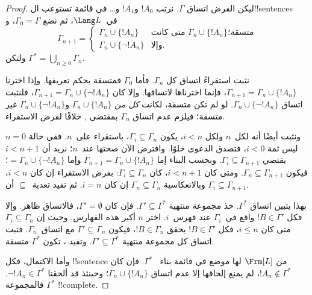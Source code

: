 \documentclass[../../../include/open-logic-section]{subfiles}
\begin{document}
\begin{proof}
ليكن الفرض اتساق $\Gamma$. نرتب $!A_0$ و$!A_1$ و\dots{} في قائمة
تستوعب ال!!{sentence}s في~$\Lang L$، ثم نضع $\Gamma_0 = \Gamma$، و
\[
\Gamma_{n+1} =
\begin{cases}
\Gamma_n \cup \{ !A_n \} & \textrm{متى كانت $\Gamma_n \cup \{!A_n\}$
  متسقة؛} \\
\Gamma_n \cup \{ \lnot !A_n \} & \textrm{وإلا.}
\end{cases}
\]
ولتكن $\Gamma^* = \bigcup_{n \geq 0} \Gamma_n$.

نثبت استقراءً اتساق كل $\Gamma_n$. فأما $\Gamma_0$ فمتسقة بحكم
تعريفها. وإذا اخترنا $\Gamma_{n+1} = \Gamma_n \cup \{!A_n\}$، فإنما
اخترناها لاتساقها. وإلا كان $\Gamma_{n+1} = \Gamma_n \cup \{\lnot !A_n\}$،
فلنثبت اتساق $\Gamma_n \cup \{\lnot !A_n\}$. لو لم تكن متسقة، لكانت
\emph{كل من} $\Gamma_n \cup \{!A_n\}$ و$\Gamma_n \cup \{\lnot !A_n\}$
غير متسقة؛ فيلزم عدم اتساق $\Gamma_n$ بمقتضى
,
خلافًا لفرض الاستقراء.

ونثبت أيضًا أنه لكل~$n$ ولكل $i < n$، يكون $\Gamma_i \subseteq \Gamma_n$،
باستقراء على~$n$. ففي حالة $n=0$ ليس ثمة $i < 0$، فتصدق الدعوى
خلوًا. وافترض الآن صحتها عند~$n$؛ نريد أن $i < n+1$ يقتضي
$\Gamma_i \subseteq \Gamma_{n+1}$. وبحسب البناء إما
$\Gamma_{n+1} = \Gamma_n \cup \{!A_n\}$ وإما $= \Gamma_n \cup \{\lnot
!A_n\}$؛ فيكون $\Gamma_n \subseteq \Gamma_{n+1}$. ومتى كان $i < n+1$،
كان $\Gamma_i \subseteq \Gamma_n$: بفرض الاستقراء إن كان $i < n$،
وبالانعكاسية $\Gamma_n \subseteq \Gamma_n$ إن كان $i = n$. ثم تفيد
تعدية~$\subseteq$ أن $\Gamma_i \subseteq \Gamma_{n+1}$.

بهذا يتبين اتساق $\Gamma^*$. خذ مجموعة منتهية
$\Gamma' \subseteq \Gamma^*$. فإن كان $\Gamma'=\emptyset$، فالاتساق
ظاهر. وإلا فكل $!B \in \Gamma'$ واقع في~$\Gamma_i$ عند فهرس~$i$.
اختر $n$ أكبر هذه الفهارس. وحيث إن
$\Gamma_i \subseteq \Gamma_n$ متى كان $i \le n$، فكل
$!B \in \Gamma'$ يحقق $!B \in \Gamma_n$، فيكون
$\Gamma' \subseteq \Gamma_n$ مع اتساق~$\Gamma_n$. فثبت اتساق كل
مجموعة منتهية $\Gamma' \subseteq \Gamma^*$. وتفيد ، تكون $\Gamma^*$ متسقة.

وأما الاكتمال، فكل !!{sentence} من $\Frm[L]$ لها موضع في قائمة بناء
~$\Gamma^*$. فإن كان $!A_n \notin \Gamma^*$، لم يمنع إلحاقها إلا
عدم اتساق $\Gamma_n \cup \{!A_n\}$؛ وحينئذ قد ألحقنا
$\lnot !A_n \in \Gamma^*$. فالمجموعة $\Gamma^*$ !!{complete}.
\end{proof}
\end{document}
